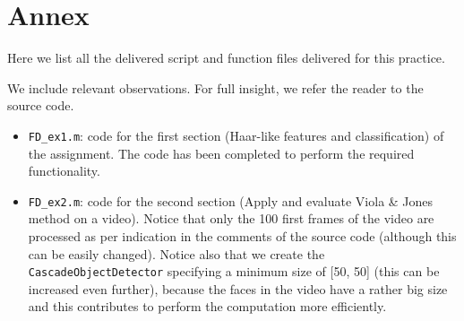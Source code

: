 \section{Annex}

Here we list all the delivered script and function files delivered for this practice.

We include relevant observations. For full insight, we refer the reader to the
source code.

\begin{itemize}
	\item \texttt{FD\_ex1.m}: code for the first section (Haar-like features and classification) of
	the assignment. The code has been completed to perform the required functionality.
	\item \texttt{FD\_ex2.m}: code for the second section (Apply and evaluate Viola \& Jones
	method on a video). Notice that only the 100 first frames of the video are processed as per
	indication in the comments of the source code (although this can be easily changed). Notice
	also that we create the \texttt{CascadeObjectDetector} specifying a minimum size of [50, 50]
	(this can be increased even further), because the faces in the video have a rather big size
	and this contributes to perform the computation more efficiently.
\end{itemize}

